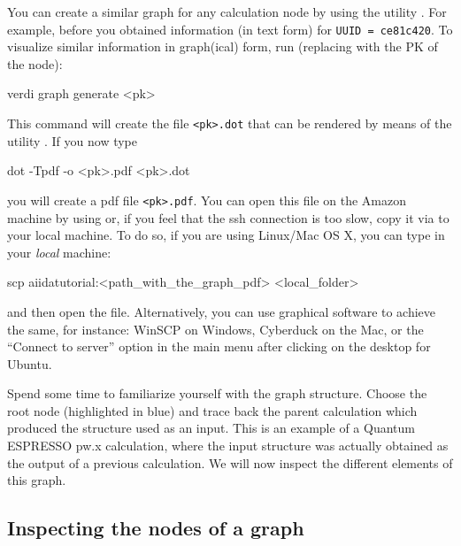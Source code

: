 You can create a similar graph for any calculation node by using the utility . For example, before you obtained information (in text form) for \texttt{UUID = ce81c420}. To visualize similar information in graph(ical) form, run (replacing  with the PK of the node):
\begin{bashcommand}
verdi graph generate <pk>
\end{bashcommand}

This command will create the file \texttt{<pk>.dot} that can be rendered by means of the utility . If you now type 
\begin{bashcommand}
dot -Tpdf -o <pk>.pdf <pk>.dot
\end{bashcommand}
you will create a pdf file \texttt{<pk>.pdf}. You can open this file on the Amazon machine by using  or, if you feel that the ssh connection is too slow, copy it via  to your local machine.
To do so, if you are using Linux/Mac OS X, you can type in your \emph{local} machine:
\begin{bashcommand}
scp aiidatutorial:<path_with_the_graph_pdf> <local_folder>
\end{bashcommand}
and then open the file. Alternatively, you can use graphical software to achieve the same, for instance: WinSCP on Windows, Cyberduck on the Mac, or the ``Connect to server'' option in the main menu after clicking on the desktop for Ubuntu.

Spend some time to familiarize yourself with the graph structure. Choose the root node (highlighted in blue) and trace back the parent calculation which produced the structure used as an input. This is an example of a Quantum ESPRESSO pw.x calculation, where the input structure was actually obtained as the output of a previous calculation. We will now inspect the different elements of this graph.

\subsection{Inspecting the nodes of a graph}
